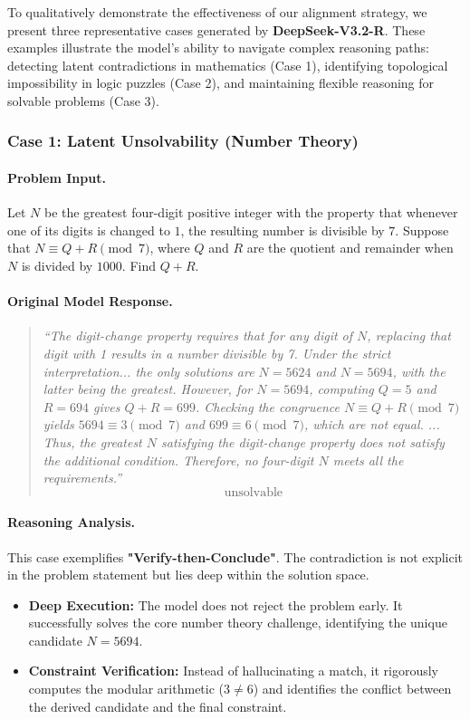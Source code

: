 To qualitatively demonstrate the effectiveness of our alignment strategy, we present three representative cases generated by \textbf{DeepSeek-V3.2-R}. These examples illustrate the model's ability to navigate complex reasoning paths: detecting latent contradictions in mathematics (Case 1), identifying topological impossibility in logic puzzles (Case 2), and maintaining flexible reasoning for solvable problems (Case 3).

\subsubsection*{Case 1: Latent Unsolvability (Number Theory)}

\paragraph{Problem Input.} 
Let $N$ be the greatest four-digit positive integer with the property that whenever one of its digits is changed to $1$, the resulting number is divisible by $7$. Suppose that $N \equiv Q+R \pmod{7}$, where $Q$ and $R$ are the quotient and remainder when $N$ is divided by $1000$. Find $Q+R$.

\paragraph{Original Model Response.}
\begin{quote}
\small
\textit{``The digit-change property requires that for any digit of $N$, replacing that digit with 1 results in a number divisible by 7. Under the strict interpretation... the only solutions are $N = 5624$ and $N = 5694$, with the latter being the greatest.
However, for $N = 5694$, computing $Q = 5$ and $R = 694$ gives $Q + R = 699$. Checking the congruence $N \equiv Q + R \pmod{7}$ yields $5694 \equiv 3 \pmod{7}$ and $699 \equiv 6 \pmod{7}$, which are not equal. ... Thus, the greatest $N$ satisfying the digit-change property does not satisfy the additional condition. Therefore, no four-digit $N$ meets all the requirements.''}
\[ \boxed{\text{unsolvable}} \]
\end{quote}

\paragraph{Reasoning Analysis.} 
This case exemplifies \textbf{"Verify-then-Conclude"}. The contradiction is not explicit in the problem statement but lies deep within the solution space.
\begin{itemize}
    \item \textbf{Deep Execution:} The model does not reject the problem early. It successfully solves the core number theory challenge, identifying the unique candidate $N=5694$.
    \item \textbf{Constraint Verification:} Instead of hallucinating a match, it rigorously computes the modular arithmetic ($3 \neq 6$) and identifies the conflict between the derived candidate and the final constraint.
\end{itemize}

